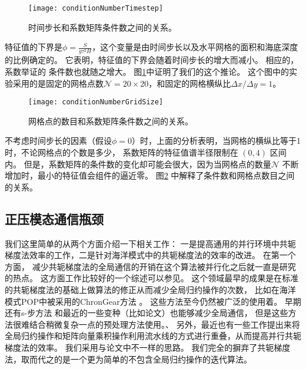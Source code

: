 \begin{figure}[ht]
\centering
\texttt{[image: conditionNumberTimestep]}
\caption[] {时间步长和系数矩阵条件数之间的关系。 \label{fig:conditionNumberDt}}
\end{figure}



特征值的下界是$\phi=\frac{S }{g \tau^2 H}$，这个变量是由时间步长以及水平网格的面积和海底深度的比例确定的。
它表明，特征值的下界会随着时间步长的增大而减小。 
相应的，系数举证的 条件数也就随之增大。
图\ref{fig:conditionNumberDt}中证明了我们的这个推论。
这个图中的实验采用的是固定的网格点数$\mathcal{N} = 20\times 20$，和固定的网格横纵比$\Delta x /{\Delta y} = 1$。 

\begin{figure}[ht]
\centering
\texttt{[image: conditionNumberGridSize]}
\caption[] {网格点的数目和系数矩阵条件数之间的关系。 \label{fig:conditionNumbGrid}}
\end{figure}
 
不考虑时间步长的因素（假设$\phi=0$）时，上面的分析表明，当网格的横纵比等于1时，不论网格点的个数是多少， 系数矩阵的特征值谱半径限制在 $(0,4)$ 区间内。
但是，系数矩阵的条件数的变化却可能会很大，因为当网格点的数量$\mathcal{N}$ 不断增加时，最小的特征值会组件的逼近零。 
图\ref{fig:conditionNumbGrid} 中解释了条件数和网格点数目之间的关系。 



\subsection{正压模态通信瓶颈}
\label{related:bottleneck}

我们这里简单的从两个方面介绍一下相关工作： 一是提高通用的并行环境中共轭梯度法效率的工作，二是针对海洋模式中的共轭梯度法的效率的改进。
在第一个方面， 减少共轭梯度法的全局通信的开销在这个算法被并行化之后就一直是研究的热点。 
这方面工作比较好的一个综述可以参见\cite{ghysels2014}。 
这个领域最早的成果是在标准的共轭梯度法的基础上做算法的修正从而减少全局归约操作的次数， 比如在海洋模式POP中被采用的ChronGear方法\cite{dAzevedo1999lapack} 。 这些方法至今仍然被广泛的使用着。 
早期还有s-步方法\cite{chron1989} 和最近的一些变种（比如论文）也能够减少全局通信， 但是这些方法很难结合稍微复杂一点的预处理方法使用。、
另外，最近也有一些工作提出来将全局归约操作和矩阵向量乘积操作利用流水线的方式进行重叠\cite{ghysels2014}，从而提高并行共轭梯度法的效率。  
我们采用与论文中不一样的思路。
我们完全的摒弃了共轭梯度法，取而代之的是一个更为简单的不包含全局归约操作的迭代算法。 



